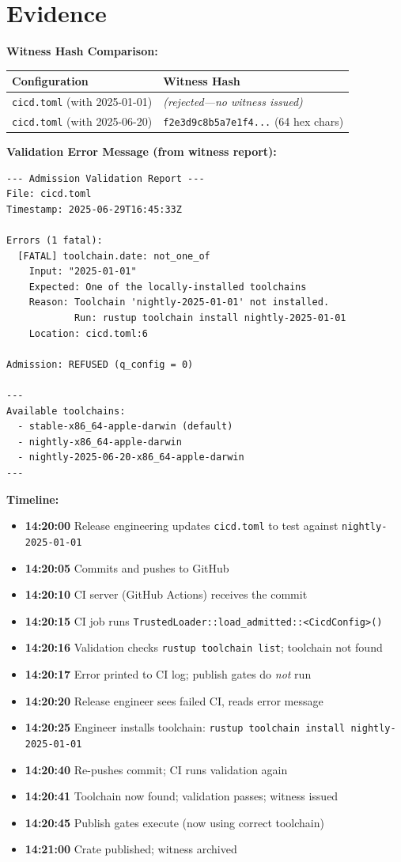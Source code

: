 \documentclass[11pt,a4paper]{article}
\begin{document}
\section*{Evidence}

\textbf{Witness Hash Comparison:}

\begin{tabular}{ll}
\toprule
\textbf{Configuration} & \textbf{Witness Hash} \\
\midrule
\texttt{cicd.toml} (with 2025-01-01) & \textit{(rejected—no witness issued)} \\
\texttt{cicd.toml} (with 2025-06-20) & \texttt{f2e3d9c8b5a7e1f4...} (64 hex chars) \\
\bottomrule
\end{tabular}

\textbf{Validation Error Message (from witness report):}

\begin{Verbatim}[fontsize=\small]
--- Admission Validation Report ---
File: cicd.toml
Timestamp: 2025-06-29T16:45:33Z

Errors (1 fatal):
  [FATAL] toolchain.date: not_one_of
    Input: "2025-01-01"
    Expected: One of the locally-installed toolchains
    Reason: Toolchain 'nightly-2025-01-01' not installed.
            Run: rustup toolchain install nightly-2025-01-01
    Location: cicd.toml:6

Admission: REFUSED (q_config = 0)

---
Available toolchains:
  - stable-x86_64-apple-darwin (default)
  - nightly-x86_64-apple-darwin
  - nightly-2025-06-20-x86_64-apple-darwin
---
\end{Verbatim}

\textbf{Timeline:}
\begin{itemize}
  \item \textbf{14:20:00} Release engineering updates \texttt{cicd.toml} to test against \texttt{nightly-2025-01-01}
  \item \textbf{14:20:05} Commits and pushes to GitHub
  \item \textbf{14:20:10} CI server (GitHub Actions) receives the commit
  \item \textbf{14:20:15} CI job runs \texttt{TrustedLoader::load\_admitted::<CicdConfig>()}
  \item \textbf{14:20:16} Validation checks \texttt{rustup toolchain list}; toolchain not found
  \item \textbf{14:20:17} Error printed to CI log; publish gates do \emph{not} run
  \item \textbf{14:20:20} Release engineer sees failed CI, reads error message
  \item \textbf{14:20:25} Engineer installs toolchain: \texttt{rustup toolchain install nightly-2025-01-01}
  \item \textbf{14:20:40} Re-pushes commit; CI runs validation again
  \item \textbf{14:20:41} Toolchain now found; validation passes; witness issued
  \item \textbf{14:20:45} Publish gates execute (now using correct toolchain)
  \item \textbf{14:21:00} Crate published; witness archived
\end{itemize}
\end{document}
